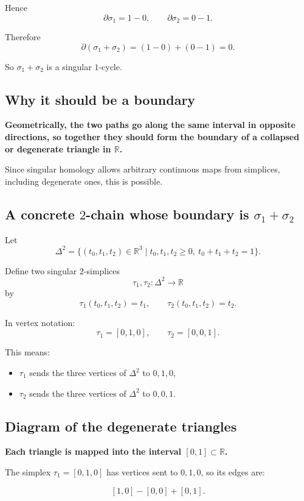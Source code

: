 \documentclass[12pt,a4paper]{article}
\theoremstyle{notespace}
\begin{document}
Hence
\[
\partial \sigma_1 = 1-0,
\qquad
\partial \sigma_2 = 0-1.
\]

Therefore
\[
\partial(\sigma_1+\sigma_2)
=
(1-0)+(0-1)=0.
\]

So \(\sigma_1+\sigma_2\) is a singular \(1\)-cycle.

\subsection{Why it should be a boundary}

\textbf{Geometrically, the two paths go along the same interval in opposite directions, so together they should form the boundary of a collapsed or degenerate triangle in \(\mathbb{R}\).}

Since singular homology allows arbitrary continuous maps from simplices, including degenerate ones, this is possible.

\subsection{A concrete \(2\)-chain whose boundary is \(\sigma_1+\sigma_2\)}

Let
\[
\Delta^2=\{(t_0,t_1,t_2)\in\mathbb{R}^3 \mid t_0,t_1,t_2\ge 0,\ t_0+t_1+t_2=1\}.
\]

Define two singular \(2\)-simplices
\[
\tau_1,\tau_2:\Delta^2\to \mathbb{R}
\]
by
\[
\tau_1(t_0,t_1,t_2)=t_1,
\qquad
\tau_2(t_0,t_1,t_2)=t_2.
\]

In vertex notation:
\[
\tau_1=[0,1,0],
\qquad
\tau_2=[0,0,1].
\]

This means:

\begin{itemize}
	\item \(\tau_1\) sends the three vertices of \(\Delta^2\) to \(0,1,0\),
	\item \(\tau_2\) sends the three vertices of \(\Delta^2\) to \(0,0,1\).
\end{itemize}

\subsection{Diagram of the degenerate triangles}

\textbf{Each triangle is mapped into the interval \([0,1]\subset\mathbb{R}\).}

The simplex \(\tau_1=[0,1,0]\) has vertices sent to \(0,1,0\), so its edges are:

\[
[1,0]-[0,0]+[0,1].
\]
\end{document}
